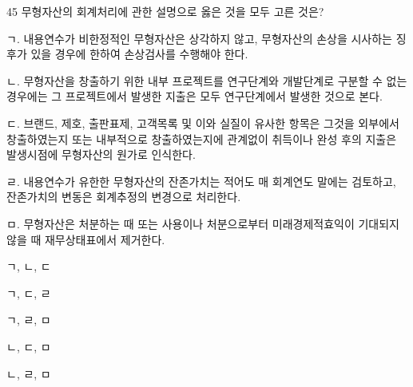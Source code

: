 \begin{question}{45}
무형자산의 회계처리에 관한 설명으로 옳은 것을 모두 고른 것은?
\begin{framedtext}
ㄱ. 내용연수가 비한정적인 무형자산은 상각하지 않고, 무형자산의 손상을 시사하는 징후가 있을 경우에 한하여 손상검사를 수행해야 한다. \par
ㄴ. 무형자산을 창출하기 위한 내부 프로젝트를 연구단계와 개발단계로 구분할 수 없는 경우에는 그 프로젝트에서 발생한 지출은 모두 연구단계에서 발생한 것으로 본다. \par
ㄷ. 브랜드, 제호, 출판표제, 고객목록 및 이와 실질이 유사한 항목은 그것을 외부에서 창출하였는지 또는 내부적으로 창출하였는지에 관계없이 취득이나 완성 후의 지출은 발생시점에 무형자산의 원가로 인식한다. \par
ㄹ. 내용연수가 유한한 무형자산의 잔존가치는 적어도 매 회계연도 말에는 검토하고, 잔존가치의 변동은 회계추정의 변경으로 처리한다. \par
ㅁ. 무형자산은 처분하는 때 또는 사용이나 처분으로부터 미래경제적효익이 기대되지 않을 때 재무상태표에서 제거한다. \par
\end{framedtext}
\begin{choices}
  \item ㄱ, ㄴ, ㄷ
  \item ㄱ, ㄷ, ㄹ
  \item ㄱ, ㄹ, ㅁ
  \item ㄴ, ㄷ, ㅁ
  \item ㄴ, ㄹ, ㅁ
\end{choices}
\end{question}
